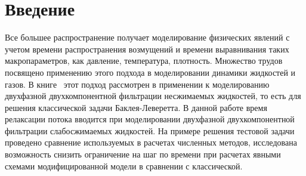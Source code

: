 \section{Введение}
Все большее распространение получает моделирование физических явлений
с учетом времени распространения возмущений и времени выравнивания таких макропараметров,
как давление, температура, плотность.
Множество трудов посвящено применению этого подхода в моделировании динамики
жидкостей и газов. В книге~\cite{Hasanov} этот подход рассмотрен в применении к моделированию
двухфазной двухкомпонентной фильтрации несжимаемых жидкостей, то есть для решения классической задачи Баклея-Леверетта.
В данной работе время релаксации потока вводится при моделировании двухфазной двухкомпонентной
фильтрации слабосжимаемых жидкостей. На примере решения тестовой задачи проведено сравнение используемых в расчетах численных методов,
исследована возможность снизить ограничение на шаг по времени при расчетах явными схемами
модифицированной модели в сравнении с классической.